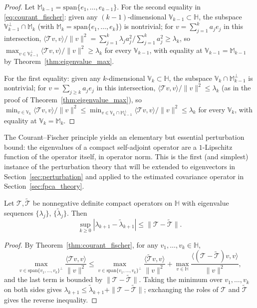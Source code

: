 \begin{proof}
Let $\mathbb{M}_{k-1}=\mathrm{span}\{e_1,\dots,e_{k-1}\}$. For the second
equality in \eqref{eq:courant_fischer}: given any $(k-1)$-dimensional
$\mathbb{V}_{k-1}\subset\mathbb{H}$, the subspace $\mathbb{V}_{k-1}^\perp
\cap\mathbb{M}_k$ (with $\mathbb{M}_k=\mathrm{span}\{e_1,\dots,e_k\}$) is
nontrivial; for $v=\sum_{j=1}^k a_je_j$ in this intersection,
$\langle\mathcal{T}v,v\rangle/\|v\|^2 = \sum_{j=1}^k\lambda_ja_j^2\big/
\sum_{j=1}^k a_j^2\geq\lambda_k$, so
$\max_{v\in\mathbb{V}_{k-1}^\perp}\langle\mathcal{T}v,v\rangle/\|v\|^2
\geq\lambda_k$ for every $\mathbb{V}_{k-1}$, with equality at
$\mathbb{V}_{k-1}=\mathbb{M}_{k-1}$ by Theorem~\ref{thm:eigenvalue_max}.

For the first equality: given any $k$-dimensional $\mathbb{V}_k\subset
\mathbb{H}$, the subspace $\mathbb{V}_k\cap\mathbb{M}_{k-1}^\perp$ is
nontrivial; for $v=\sum_{j\geq k}a_je_j$ in this intersection,
$\langle\mathcal{T}v,v\rangle/\|v\|^2\leq\lambda_k$ (as in the proof of
Theorem~\ref{thm:eigenvalue_max}), so $\min_{v\in\mathbb{V}_k}\langle
\mathcal{T}v,v\rangle/\|v\|^2 \leq \min_{v\in\mathbb{V}_k\cap
\mathbb{M}_{k-1}^\perp}\langle\mathcal{T}v,v\rangle/\|v\|^2\leq\lambda_k$
for every $\mathbb{V}_k$, with equality at $\mathbb{V}_k=\mathbb{M}_k$.
\end{proof}

The Courant--Fischer principle yields an elementary but essential
perturbation bound: the eigenvalues of a compact self-adjoint operator are
a $1$-Lipschitz function of the operator itself, in operator norm. This is
the first (and simplest) instance of the perturbation theory that will be
extended to eigenvectors in Section~\ref{sec:perturbation} and applied to
the estimated covariance operator in Section~\ref{sec:fpca_theory}.

\begin{theorem}
\label{thm:eigenvalue_perturbation}
Let $\mathcal{T},\widetilde{\mathcal{T}}$ be nonnegative definite compact
operators on $\mathbb{H}$ with eigenvalue sequences $\{\lambda_j\}$,
$\{\widetilde\lambda_j\}$. Then
\begin{equation}
\sup_{k\geq 0}|\lambda_{k+1}-\widetilde\lambda_{k+1}| \leq
\|\mathcal{T}-\widetilde{\mathcal{T}}\|.
\label{eq:eigenvalue_perturbation}
\end{equation}
\end{theorem}

\begin{proof}
By Theorem~\ref{thm:courant_fischer}, for any $v_1,\dots,v_k\in\mathbb{H}$,
\[
\max_{v\in\mathrm{span}\{v_1,\dots,v_k\}^\perp}\frac{\langle\mathcal{T}v,v
\rangle}{\|v\|^2} \leq
\max_{v\in\mathrm{span}\{v_1,\dots,v_k\}^\perp}\frac{\langle\widetilde{
\mathcal{T}}v,v\rangle}{\|v\|^2} +
\max_{v\in\mathbb{H}}\frac{\langle(\mathcal{T}-\widetilde{\mathcal{T}})v,v
\rangle}{\|v\|^2},
\]
and the last term is bounded by $\|\mathcal{T}-\widetilde{\mathcal{T}}\|$.
Taking the minimum over $v_1,\dots,v_k$ on both sides gives
$\lambda_{k+1}\leq\widetilde\lambda_{k+1}+\|\mathcal{T}-
\widetilde{\mathcal{T}}\|$; exchanging the roles of $\mathcal{T}$ and
$\widetilde{\mathcal{T}}$ gives the reverse inequality.
\end{proof}

